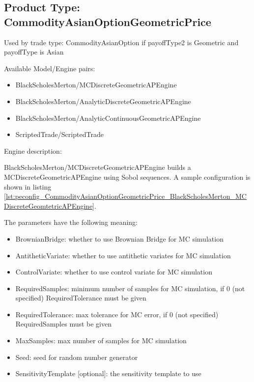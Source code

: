\subsection{Product Type: CommodityAsianOptionGeometricPrice}

Used by trade type: CommodityAsianOption if payoffType2 is Geometric and payoffType is Asian

Available Model/Engine pairs:

\begin{itemize}
  \item BlackScholesMerton/MCDiscreteGeometricAPEngine
  \item BlackScholesMerton/AnalyticDiscreteGeometricAPEngine
  \item BlackScholesMerton/AnalyticContinuousGeometricAPEngine
  \item ScriptedTrade/ScriptedTrade
\end{itemize}

Engine description:

BlackScholesMerton/MCDiscreteGeometricAPEngine builds a MCDiscreteGeometricAPEngine using Sobol sequences. A sample
configuration is shown in listing
\ref{lst:peconfig_CommodityAsianOptionGeometricPrice_BlackScholesMerton_MCDiscreteGeomtetricAPEngine}.

The parameters have the following meaning:

\begin{itemize}
\item BrownianBridge: whether to use Brownian Bridge for MC simulation
\item AntitheticVariate: whether to use antithetic variates for MC simulation
\item ControlVariate: whether to use control variate for MC simulation
\item RequiredSamples: minimum number of samples for MC simulation, if 0 (not specified) RequiredTolerance must be given
\item RequiredTolerance: max tolerance for MC error, if 0 (not specified) RequiredSamples must be given
\item MaxSamples: max number of samples for MC simulation
\item Seed: seed for random number generator
\item SensitivityTemplate [optional]: the sensitivity template to use
\end{itemize}

